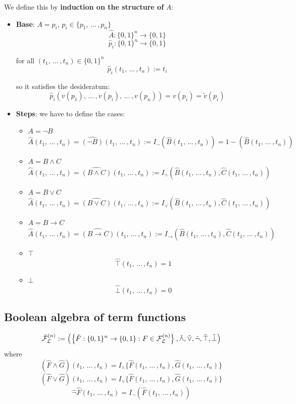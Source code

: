 	We define this by \textbf{induction on the structure of} $A$:
	\begin{itemize}
		\item \textbf{Base}: $A = p_i$, $p_i \in \{p_1, \, ... \, , p_n\}$
		$$ \hat{A}: \{0,1\}^n \rightarrow \{0,1\}$$
		$$ \hat{p}_i: \{0,1\}^n \rightarrow \{0,1\}$$

		for all $(t_1, \, ... \, , t_n) \in \{0,1\}^n$
		$$ \hat{p}_i (t_1, \, ... \, , t_n) :=  t_i $$

		so it satisfies the desideratum:
		$$ \hat{p}_i (v(p_1), \, ... \, , v(p_i), \, ... \, , v(p_n)) = v(p_i) = \tilde{v} (p_i) $$

		\item \textbf{Steps}: we have to define the cases:
		\begin{itemize}
			\item $A = \neg B$
			$$ \hat{A} (t_1, \, ... \, , t_n) = \hat{(\neg B)} (t_1, \, ... \, , t_n) := I_\neg (\hat B (t_1, \, ... \, , t_n)) =  1 - (\hat B (t_1, \, ... \, , t_n))$$

			\item $A = B \wedge C$
			$$ \hat{A} (t_1, \, ... \, , t_n) =  \hat{(B \wedge C)} (t_1, \, ... \, , t_n) := I_\wedge (\hat B (t_1, \, ... \, , t_n), \hat C (t_1, \, ... \, , t_n))$$

			\item $A = B \vee C$
			$$ \hat{A} (t_1, \, ... \, , t_n) =  \hat{(B \vee C)} (t_1, \, ... \, , t_n) := I_\vee (\hat B (t_1, \, ... \, , t_n), \hat C (t_1, \, ... \, , t_n))$$

			\item $A = B \rightarrow C$
			$$ \hat{A} (t_1, \, ... \, , t_n) =  \hat{(B \rightarrow C)} (t_1, \, ... \, , t_n) := I_\rightarrow (\hat B (t_1, \, ... \, , t_n), \hat C (t_1, \, ... \, , t_n))$$

			\item $\top$
			$$ \hat{\top} (t_1, \, ... \, , t_n) = 1$$

			\item $\bot$
			$$ \hat{\bot} (t_1, \, ... \, , t_n) = 0$$
		\end{itemize}
	\end{itemize}

	\subsection{Boolean algebra of term functions}

	$$ \hat{\mathcal{F}}_\mathcal{L}^{(n)} := \left( \left\{\hat F: \{0,1\}^n \rightarrow \{0,1\}: F \in \mathcal{F}_\mathcal{L}^{(n)} \right\}, \hat \wedge, \hat \vee, \hat \neg, \hat \top, \hat \bot \right)$$
	where
	$$ (\hat F \wedge \hat G) (t_1, \, ... \, , t_n) = I_\wedge \{\hat F (t_1, \, ... \, , t_n), \hat G (t_1, \, ... \, , t_n)\}$$
	$$ (\hat F \vee \hat G) (t_1, \, ... \, , t_n) = I_\vee \{\hat F (t_1, \, ... \, , t_n), \hat G (t_1, \, ... \, , t_n)\}$$
	$$ \hat \neg \hat F (t_1, \, ... \, , t_n) = I_\neg (\hat F (t_1, \, ... \, , t_n)) $$

